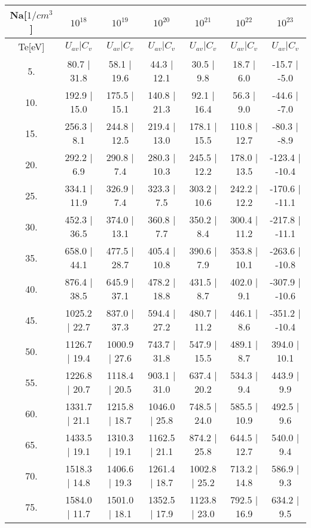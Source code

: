 \begin{tabular}{|c||c|c|c|c|c|c|}
\hline
Na[$1/cm^3$] & $10^{18}$ & $10^{19}$ & $10^{20}$ & $10^{21}$ & $10^{22}$ & $10^{23}$\tabularnewline
\hline
Te[eV] & $U_{av} | C_v$ & $U_{av} | C_v$ & $U_{av} | C_v$ & $U_{av} | C_v$ & $U_{av} | C_v$ & $U_{av} | C_v$\tabularnewline
\hline
\hline
   5. &     80.7 |    31.8 &     58.1 |    19.6 &     44.3 |    12.1 &     30.5 |     9.8 &     18.7 |     6.0 &    -15.7 |    -5.0\tabularnewline
\hline
  10. &    192.9 |    15.0 &    175.5 |    15.1 &    140.8 |    21.3 &     92.1 |    16.4 &     56.3 |     9.0 &    -44.6 |    -7.0\tabularnewline
\hline
  15. &    256.3 |     8.1 &    244.8 |    12.5 &    219.4 |    13.0 &    178.1 |    15.5 &    110.8 |    12.7 &    -80.3 |    -8.9\tabularnewline
\hline
  20. &    292.2 |     6.9 &    290.8 |     7.4 &    280.3 |    10.3 &    245.5 |    12.2 &    178.0 |    13.5 &   -123.4 |   -10.4\tabularnewline
\hline
  25. &    334.1 |    11.9 &    326.9 |     7.4 &    323.3 |     7.5 &    303.2 |    10.6 &    242.2 |    12.2 &   -170.6 |   -11.1\tabularnewline
\hline
  30. &    452.3 |    36.5 &    374.0 |    13.1 &    360.8 |     7.7 &    350.2 |     8.4 &    300.4 |    11.2 &   -217.8 |   -11.1\tabularnewline
\hline
  35. &    658.0 |    44.1 &    477.5 |    28.7 &    405.4 |    10.8 &    390.6 |     7.9 &    353.8 |    10.1 &   -263.6 |   -10.8\tabularnewline
\hline
  40. &    876.4 |    38.5 &    645.9 |    37.1 &    478.2 |    18.8 &    431.5 |     8.7 &    402.0 |     9.1 &   -307.9 |   -10.6\tabularnewline
\hline
  45. &   1025.2 |    22.7 &    837.0 |    37.3 &    594.4 |    27.2 &    480.7 |    11.2 &    446.1 |     8.6 &   -351.2 |   -10.4\tabularnewline
\hline
  50. &   1126.7 |    19.4 &   1000.9 |    27.6 &    743.7 |    31.8 &    547.9 |    15.5 &    489.1 |     8.7 &    394.0 |    10.1\tabularnewline
\hline
  55. &   1226.8 |    20.7 &   1118.4 |    20.5 &    903.1 |    31.0 &    637.4 |    20.2 &    534.3 |     9.4 &    443.9 |     9.9\tabularnewline
\hline
  60. &   1331.7 |    21.1 &   1215.8 |    18.7 &   1046.0 |    25.8 &    748.5 |    24.0 &    585.5 |    10.9 &    492.5 |     9.6\tabularnewline
\hline
  65. &   1433.5 |    19.1 &   1310.3 |    19.1 &   1162.5 |    21.1 &    874.2 |    25.8 &    644.5 |    12.7 &    540.0 |     9.4\tabularnewline
\hline
  70. &   1518.3 |    14.8 &   1406.6 |    19.3 &   1261.4 |    18.7 &   1002.8 |    25.2 &    713.2 |    14.8 &    586.9 |     9.3\tabularnewline
\hline
  75. &   1584.0 |    11.7 &   1501.0 |    18.1 &   1352.5 |    17.9 &   1123.8 |    23.0 &    792.5 |    16.9 &    634.2 |     9.5\tabularnewline

\end{tabular}
